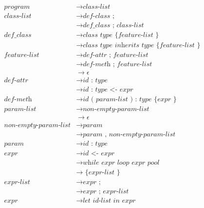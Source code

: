 \documentclass[twoside]{article}
\begin{document}
\begin{align*}
\textit{program} &\rightarrow \textit{class-list}\\
\textit{class-list} &\rightarrow \textit{def-class ;}\\
					 &\rightarrow \textit{def\_class ; class-list}\\
\textit{def\_class} &\rightarrow \textit{class type  \{ feature-list \} }\\	
&\rightarrow \textit{class type inherits type \{ feature-list \} }\\
\textit{feature-list} &\rightarrow \textit{def-attr ; feature-list}\\
&\rightarrow \textit{def-meth ; feature-list}\\
&\rightarrow \epsilon\\
\textit{def-attr} &\rightarrow \textit{id : type}\\
&\rightarrow \textit{id : type <- expr}\\
\textit{def-meth} &\rightarrow \textit{id ( param-list ) : type \{ expr \} }\\
\textit{param-list} &\rightarrow \textit{non-empty-param-list}\\
&\rightarrow \epsilon\\
\textit{non-empty-param-list} &\rightarrow \textit{param}\\
&\rightarrow \textit{param , non-empty-param-list}\\
\textit{param} &\rightarrow \textit{id : type}\\
\textit{expr} &\rightarrow \textit{id <- expr}\\
&\rightarrow \textit{while expr loop expr pool}\\
&\rightarrow \textit{ \{ expr-list \} }\\
\textit{expr-list} &\rightarrow \textit{expr ;}\\
&\rightarrow \textit{expr ; expr-list}\\
\textit{expr} &\rightarrow \textit{let id-list in expr}\\
\end{align*}
\end{document}
